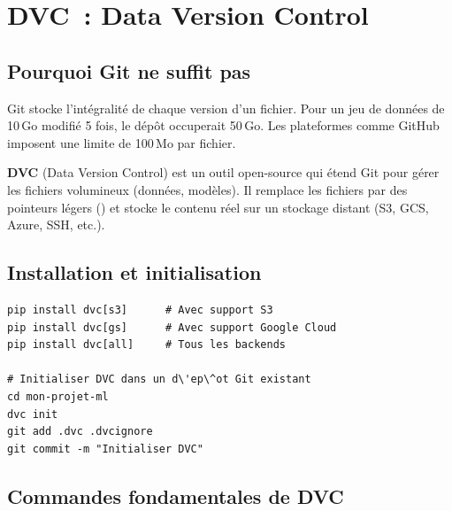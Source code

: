 \section{DVC~: Data Version Control}
\label{sec:dvc}


\subsection{Pourquoi Git ne suffit pas}

\begin{attention}[title=\textbf{Limites de Git pour les fichiers volumineux}]
Git stocke l'int\'egralit\'e de chaque version d'un fichier. Pour un jeu de
donn\'ees de 10\,Go modifi\'e 5 fois, le d\'ep\^ot occuperait 50\,Go.
Les plateformes comme GitHub imposent une limite de 100\,Mo par fichier.
\end{attention}

\begin{definition}[DVC]
\textbf{DVC} (Data Version Control) est un outil open-source qui \'etend Git
pour g\'erer les fichiers volumineux (donn\'ees, mod\`eles). Il remplace les
fichiers par des pointeurs l\'egers () et stocke le contenu
r\'eel sur un stockage distant (S3, GCS, Azure, SSH, etc.).
\end{definition}

\subsection{Installation et initialisation}

\begin{codeblock}[title=\textbf{Installation de DVC}]
\begin{verbatim}
pip install dvc[s3]      # Avec support S3
pip install dvc[gs]      # Avec support Google Cloud
pip install dvc[all]     # Tous les backends

# Initialiser DVC dans un d\'ep\^ot Git existant
cd mon-projet-ml
dvc init
git add .dvc .dvcignore
git commit -m "Initialiser DVC"
\end{verbatim}
\end{codeblock}

\subsection{Commandes fondamentales de DVC}

